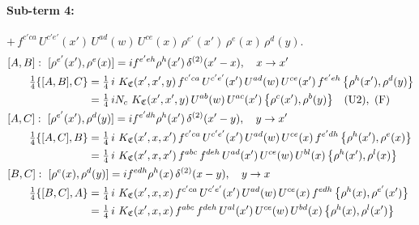\documentclass[10pt]{article}
\numberwithin{equation}{section}
\begin{document}
\paragraph{Sub-term 4:} $+\,f^{c'ca}\,U^{c'e'}(x')\,U^{ad}(w)\,U^{ce}(x)\,\rho^{e'}(x')\,\rho^{e}(x)\,\rho^{d}(y)$.
\begin{align}
&[A,B]:\ [\rho^{e'}(x'),\rho^{e}(x)]=i f^{e'eh}\rho^{h}(x')\,\delta^{(2)}(x'-x),\quad x\to x'\notag\\
&\qquad \tfrac14\{[A,B],C\}=\tfrac14\,i\,\,K_{\mathfrak C}(x',x',y)\,f^{c'ca}\,U^{c'e'}(x')\,U^{ad}(w)\,U^{ce}(x')\,f^{e'eh}\,\big\{\rho^{h}(x'),\rho^{d}(y)\big\}\notag\\
&\qquad\phantom{\tfrac14\{[A,B],C\}}=\tfrac14\,i N_{c}\,\,K_{\mathfrak C}(x',x',y)\,U^{ab}(w)\,U^{ac}(x')\,\big\{\rho^{c}(x'),\rho^{b}(y)\big\}\quad\text{(U2)},\ \text{(F)}
\label{eq:GIII.V-4-AB}\\
&[A,C]:\ [\rho^{e'}(x'),\rho^{d}(y)]=i f^{e'dh}\rho^{h}(x')\,\delta^{(2)}(x'-y),\quad y\to x'\notag\\
&\qquad \tfrac14\{[A,C],B\}=\tfrac14\,i\,\,K_{\mathfrak C}(x',x,x')\,f^{c'ca}\,U^{c'e'}(x')\,U^{ad}(w)\,U^{ce}(x)\,f^{e'dh}\,\big\{\rho^{h}(x'),\rho^{e}(x)\big\}\notag\\
&\qquad\phantom{\tfrac14\{[A,C],B\}}=\tfrac14\,i\,\,K_{\mathfrak C}(x',x,x')\,f^{abc}\,f^{deh}\,U^{ad}(x')\,U^{ce}(w)\,U^{bl}(x)\,\big\{\rho^{h}(x'),\rho^{l}(x)\big\}
\label{eq:GIII.V-4-AC}\\
&[B,C]:\ [\rho^{e}(x),\rho^{d}(y)]=i f^{edh}\rho^{h}(x)\,\delta^{(2)}(x-y),\quad y\to x\notag\\
&\qquad \tfrac14\{[B,C],A\}=\tfrac14\,i\,\,K_{\mathfrak C}(x',x,x)\,f^{c'ca}\,U^{c'e'}(x')\,U^{ad}(w)\,U^{ce}(x)\,f^{edh}\,\big\{\rho^{h}(x),\rho^{e'}(x')\big\}\notag\\
&\qquad\phantom{\tfrac14\{[B,C],A\}}=\tfrac14\,i\,\,K_{\mathfrak C}(x',x,x)\,f^{abc}\,f^{deh}\,U^{al}(x')\,U^{ce}(w)\,U^{bd}(x)\,\big\{\rho^{h}(x),\rho^{l}(x')\big\}
\label{eq:GIII.V-4-BC}
\end{align}
\end{document}
